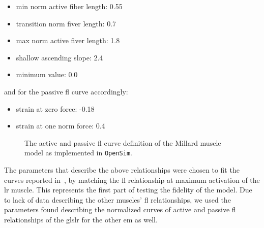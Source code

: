 \documentclass[11pt,a4paper,draft=false]{report}
\begin{document}
\begin{itemize}
\item min norm active fiber length: 0.55
\item transition norm fiver length: 0.7
\item max norm active fiver length: 1.8
\item shallow ascending slope: 2.4
\item minimum value: 0.0
\end{itemize}
%
and for the passive \gls{fl} curve accordingly:

\begin{itemize}
\item strain at zero force: -0.18
\item strain at one norm force: 0.4
\end{itemize}

\begin{figure}[!ht]
  \caption{The active and passive \gls{fl} curve definition of the Millard
    muscle model as implemented in \texttt{OpenSim}.}\label{fig:millard-curves}
\end{figure}

The parameters that describe the above relationships were chosen to fit the
curves reported in~\cite{Iskander2018}, by matching the \gls{fl} relationship at
maximum activation of the \gls{lr} muscle. This represents the first part of
testing the fidelity of the model. Due to lack of data describing the other
muscles’ \gls{fl} relationships, we used the parameters found describing the
normalized curves of active and passive \gls{fl} relationships of the gls{lr}
for the other \gls{em} as well.
\end{document}

